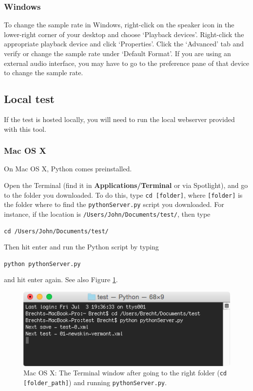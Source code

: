 \documentclass[11pt, oneside]{article}   	%
\begin{document}
		\subsubsection{Windows}
			To change the sample rate in Windows, right-click on the speaker icon in the lower-right corner of your desktop and choose `Playback devices'. Right-click the appropriate playback device and click `Properties'. Click the `Advanced' tab and verify or change the sample rate under `Default Format'.    %
			If you are using an external audio interface, you may have to go to the preference pane of that device to change the sample rate. 

	\subsection{Local test}
		If the test is hosted locally, you will need to run the local webserver provided with this tool. 
		
		\subsubsection{Mac OS X}

			On Mac OS X, Python comes preinstalled. 

			Open the Terminal (find it in \textbf{Applications/Terminal} or via Spotlight), and go to the folder you downloaded. To do this, type \texttt{cd [folder]}, where \texttt{[folder]} is the folder where to find the \texttt{pythonServer.py} script you downloaded. For instance, if the location is \texttt{/Users/John/Documents/test/}, then type
			
				\texttt{cd /Users/John/Documents/test/}
				
			Then hit enter and run the Python script by typing

				\texttt{python pythonServer.py}

			and hit enter again. See also Figure \ref{fig:terminal}.
			
			\begin{figure}[htbp]
	                \begin{center}
	                \includegraphics[width=.75\textwidth]{pythonServer.png}
	                \caption{Mac OS X: The Terminal window after going to the right folder (\texttt{cd [folder\_path]}) and running \texttt{pythonServer.py}.}
	                \label{fig:terminal}
	                \end{center}
	                \end{figure}
\end{document}
